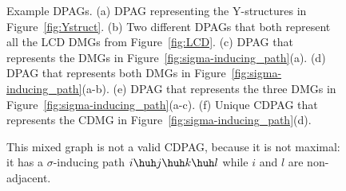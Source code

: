 \begin{figure}
  \caption{Example DPAGs. (a) DPAG representing the Y-structures in Figure~\ref{fig:Ystruct}. 
  (b) Two different DPAGs that both represent all the LCD DMGs from Figure~\ref{fig:LCD}. 
  (c) DPAG that represents the DMGs in Figure~\ref{fig:sigma-inducing_path}(a).
  (d) DPAG that represents both DMGs in Figure~\ref{fig:sigma-inducing_path}(a-b).
  (e) DPAG that represents the three DMGs in Figure~\ref{fig:sigma-inducing_path}(a-c).
  (f) Unique CDPAG that represents the CDMG in Figure~\ref{fig:sigma-inducing_path}(d).\label{fig:dpags}}
\end{figure}

\begin{figure}\centering
  \caption{This mixed graph is not a valid CDPAG, because it is not maximal: 
  it has a $\sigma$-inducing path $i \huh j \huh  k \huh l$ while $i$ and $l$ are non-adjacent.\label{fig:nonmaximal_ancestral_graph}}
\end{figure}

